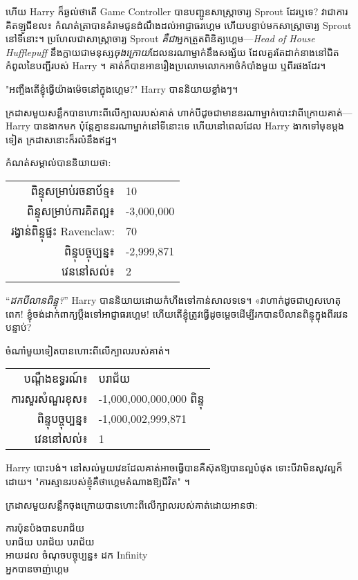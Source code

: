 {ហើយ Harry ក៏ឆ្ងល់ថាតើ Game Controller បានបញ្ជូនសាស្រ្តាចារ្យ Sprout ដែរឬទេ? វាជាការគិតឡូជីខល៖ កំណត់ត្រាបានគំរាមជូនដំណឹងដល់អាជ្ញាធរហ្គេម ហើយបន្ទាប់មកសាស្រ្តាចារ្យ Sprout នៅទីនោះ។ ប្រហែលជាសាស្រ្តាចារ្យ Sprout \emph{គឺជា}អ្នកត្រួតពិនិត្យហ្គេម—\emph{Head of House Hufflepuff} នឹងក្លាយជាមនុស្ស\emph{ចុងក្រោយ}ដែលនរណាម្នាក់នឹងសង្ស័យ ដែលគួរតែដាក់នាងនៅជិតកំពូលនៃបញ្ជីរបស់ Harry ។ គាត់ក៏បានអានរឿងប្រលោមលោកអាថ៌កំបាំងមួយ ឬពីរផងដែរ។

"អញ្ចឹងតើខ្ញុំធ្វើយ៉ាងម៉េចនៅក្នុងហ្គេម?" Harry បាននិយាយខ្លាំងៗ។

ក្រដាសមួយសន្លឹកបានហោះពីលើក្បាលរបស់គាត់ ហាក់បីដូចជាមាននរណាម្នាក់បោះវាពីក្រោយគាត់—Harry បានងាកមក ប៉ុន្តែគ្មាននរណាម្នាក់នៅទីនោះទេ ហើយនៅពេលដែល Harry ងាកទៅមុខម្តងទៀត ក្រដាសនោះក៏រលំនឹងឥដ្ឋ។

កំណត់សម្គាល់បាននិយាយថា:
\begin{writtenNote}
\begin{tabular}{rl}
ពិន្ទុសម្រាប់រចនាប័ទ្ម៖ & 10\\
ពិន្ទុសម្រាប់ការគិតល្អ៖ & -3,000,000\\
រង្វាន់ពិន្ទុផ្ទះ Ravenclaw: & 70\\
ពិន្ទុបច្ចុប្បន្ន៖ & -2,999,871\\
វេននៅសល់៖ & 2
\end{tabular}
\end{writtenNote}

“\emph{ដកបីលានពិន្ទុ?}” Harry បាននិយាយដោយកំហឹងទៅកាន់សាលទទេ។ «វា​ហាក់​ដូច​ជា​ហួស​ហេតុ​ពេក! ខ្ញុំចង់ដាក់ពាក្យប្តឹងទៅអាជ្ញាធរហ្គេម! ហើយ​តើ​ខ្ញុំ​ត្រូវ​ធ្វើ​ដូចម្តេច​ដើម្បី​រក​បាន​បី​លាន​ពិន្ទុ​ក្នុង​ពីរ​វេន​បន្ទាប់?

ចំណាំមួយទៀតបានហោះពីលើក្បាលរបស់គាត់។
\begin{writtenNote}
\begin{tabular}{rl}
បណ្តឹងឧទ្ធរណ៍៖ & បរាជ័យ\\
ការសួរសំណួរខុស៖ & -1,000,000,000,000 ពិន្ទុ\\
ពិន្ទុបច្ចុប្បន្ន៖ & -1,000,002,999,871\\
វេននៅសល់៖ & 1
\end{tabular}
\end{writtenNote}

Harry បោះបង់។ នៅ​សល់​មួយ​វេន​ដែល​គាត់​អាច​ធ្វើ​បាន​គឺ​ស៊ុត​ឱ្យ​បាន​ល្អ​បំផុត ទោះ​បី​វា​មិន​សូវ​ល្អ​ក៏​ដោយ។ "ការស្មានរបស់ខ្ញុំគឺថាហ្គេមតំណាងឱ្យជីវិត" ។

ក្រដាសមួយសន្លឹកចុងក្រោយបានហោះពីលើក្បាលរបស់គាត់ដោយអានថា:

\begin{writtenNote}
ការប៉ុនប៉ងបានបរាជ័យ\\
បរាជ័យ បរាជ័យ បរាជ័យ\\
អាយដល
ចំណុចបច្ចុប្បន្ន៖ ដក Infinity\\
\MakeUppercase{អ្នកបានចាញ់ហ្គេម}


\end{writtenNote}}
